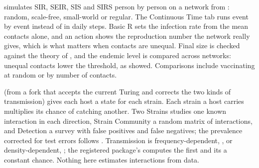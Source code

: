  simulates SIR, SEIR, SIS and SIRS person by person on a network from : random, scale-free, small-world or regular. The Continuous Time tab runs event by event instead of in daily steps. Basic R sets the infection rate from the mean contacts alone, and an action shows the reproduction number the network really gives, which is what matters when contacts are unequal. Final size is checked against the theory of , and the endemic level is compared across networks: unequal contacts lower the threshold, as  showed. Comparisons include vaccinating at random or by number of contacts.

 (from a fork that accepts the current Turing and corrects the two kinds of transmission) gives each host a state for each strain. Each strain a host carries multiplies its chance of catching another. Two Strains studies one known interaction in each direction, Strain Community a random matrix of interactions, and Detection a survey with false positives and false negatives; the prevalence corrected for test errors follows . Transmission is frequency-dependent, , or density-dependent, ; the registered package's  computes the first and its  a constant chance. Nothing here estimates interactions from data.

